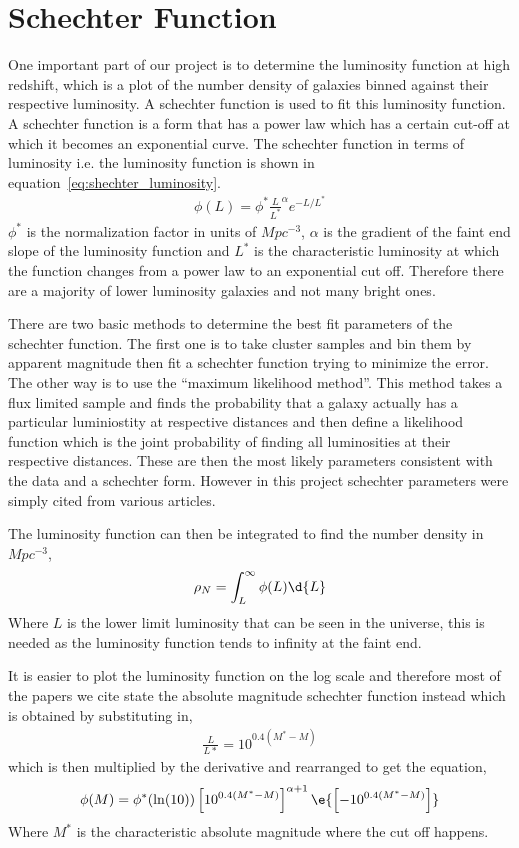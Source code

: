 \section{Schechter Function} %
\label{sec:schechter_function}
	One important part of our project is to determine the luminosity function at high redshift, which is a plot of the number density of galaxies binned against their respective luminosity. A schechter function is used to fit this luminosity function. A schechter function is a form that has a power law which has a certain cut-off at which it becomes an exponential curve. The schechter function in terms of luminosity i.e. the luminosity function is shown in equation~\ref{eq:shechter_luminosity}\cite{cosmo_number_densities}.
	\begin{align}
		\phi(L)=\phi^{*}\frac{L}{L^{*}}^{\alpha}e^{-L/L^{*}} \label{eq:shechter_luminosity}
	\end{align}
	$\phi^{*}$ is the normalization factor in units of $Mpc^{-3}$, $\alpha$ is the gradient of the faint end slope of the luminosity function and $L^{*}$ is the characteristic luminosity at which the function changes from a power law to an exponential cut off. Therefore there are a majority of lower luminosity galaxies and not many bright ones.

	There are two basic methods to determine the best fit parameters of the schechter function\cite{luminosity_functions_online}. The first one is to take cluster samples and bin them by apparent magnitude then fit a schechter function trying to minimize the error. The other way is to use the ``maximum likelihood method''. This method takes a flux limited sample and finds the probability that a galaxy actually has a particular luminiostity at respective distances and then define a likelihood function which is the joint probability of finding all luminosities at their respective distances. These are then the most likely parameters consistent with the data and a schechter form. However in this project schechter parameters were simply cited from various articles.

	The luminosity function can then be integrated to find the number density in $Mpc^{-3}$,
	\begin{align}
		\rho_{N}=\int^{\infty}_{L}\phi(L)\d{L}
	\end{align}
	Where $L$ is the lower limit luminosity that can be seen in the universe, this is needed as the luminosity function tends to infinity at the faint end.

	It is easier to plot the luminosity function on the log scale and therefore most of the papers we cite state the absolute magnitude schechter function instead which is obtained by substituting in,
	\begin{align}
		\frac{L}{L*}=10^{0.4(M^{*}-M)}
	\end{align}
	which is then multiplied by the derivative and rearranged to get the equation,
	\begin{align}
		\phi(M)=\phi^{*}(\ln(10))\left[10^{0.4(M^{*}-M)}\right]^{\alpha+1}\e{\left[-10^{0.4(M^{*}-M)}\right]}
	\end{align}
	Where $M^{*}$ is the characteristic absolute magnitude where the cut off happens.

